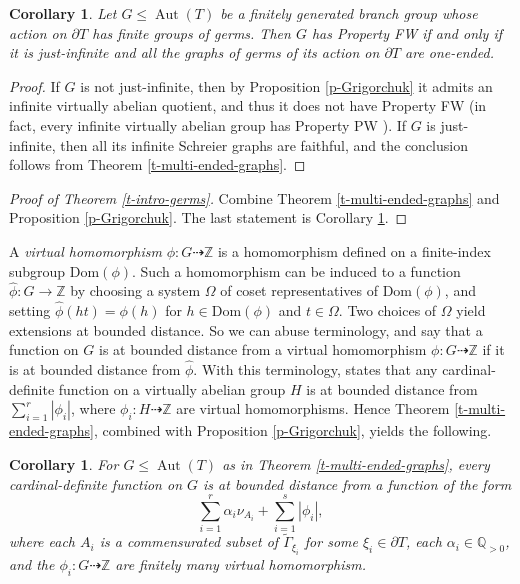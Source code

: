 \documentclass[11pt]{amsart}
\newcommand{\Z}{\ensuremath{\mathbb{Z}}}%
\newcommand{\aut}{\ensuremath{\operatorname{Aut}}}%
\newcommand{\Gammatilde}{\ensuremath{\widetilde{\Gamma}}}%
\theoremstyle{definition}
\theoremstyle{plain}
\newtheorem{main thm}{Theorem}
\newtheorem{cor}[defin]{Corollary}{}
\theoremstyle{remark}
\theoremstyle{plain}
\begin{document}
\begin{cor}\label{c-FW}
Let $G\le \aut(T)$ be a finitely generated branch group whose action on $\partial T$ has finite groups of germs. 
Then $G$ has Property FW if and only if it is just-infinite and all the graphs of germs of its action on $\partial T$ are one-ended. 
\end{cor}
\begin{proof}
    If $G$ is not just-infinite, then by Proposition \ref{p-Grigorchuk} it admits an infinite virtually abelian quotient, and thus it does not have Property FW (in fact, every infinite virtually abelian group has Property PW \cite[Proposition 5.C.2]{Cor-FWsurvey}). If $G$ is just-infinite, then all its infinite Schreier graphs are faithful, and the conclusion follows from Theorem \ref{t-multi-ended-graphs}. 
\end{proof}
\begin{proof}[Proof of Theorem \ref{t-intro-germs}]
    Combine Theorem \ref{t-multi-ended-graphs} and Proposition \ref{p-Grigorchuk}. The last statement is Corollary \ref{c-FW}. \qedhere\end{proof}
 A \emph{virtual homomorphism} $\phi\colon G\dashrightarrow \Z$ is a homomorphism defined on a finite-index subgroup $\mathrm{Dom}(\phi)$. Such a homomorphism can be induced to a function $\widehat{\phi}\colon G\to \Z$ by choosing a system $\Omega$ of coset representatives of $\mathrm{Dom}(\phi)$, and setting $\widehat{\phi}(ht)=\phi(h)$ for $h\in \mathrm{Dom}(\phi)$ and $t\in \Omega$. Two choices of $\Omega$ yield extensions at bounded distance. So we can abuse terminology, and say that a function on $G$ is at bounded distance from a virtual homomorphism  $\phi\colon G\dashrightarrow \Z$ if it is at bounded distance from $\widehat{\phi}$. With this terminology, \cite[Proposition 6.B.3]{Cor-FWsurvey} states that any cardinal-definite function on a virtually abelian group $H$ is at bounded distance from $\sum_{i=1}^r|\phi_i|$, where $\phi_i\colon H\dashrightarrow \Z$ are  virtual homomorphisms. Hence Theorem \ref{t-multi-ended-graphs}, combined with Proposition \ref{p-Grigorchuk}, yields the following. 

\begin{cor} \label{c-cardinal-definite}
    For $G\le \aut(T)$ as in Theorem \ref{t-multi-ended-graphs}, every cardinal-definite function on $G$ is at bounded distance from  a function of the form \[\sum_{i=1}^r \alpha_i\nu_{A_i} +\sum_{i=1}^s|\phi_i|,\] where
each $A_i$ is a commensurated subset of $\Gammatilde_{\xi_i}$ for some $\xi_i\in \partial T$, each  $\alpha_i\in \mathbb{Q}_{>0}$, and the $\phi_i\colon G\dashrightarrow \Z$ are finitely many virtual homomorphism.  
    
\end{cor}
\end{document}
